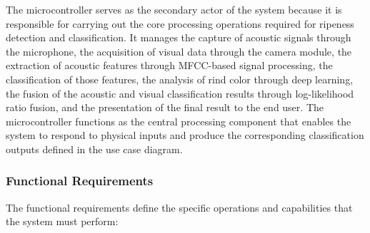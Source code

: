 \begin{thesisprose}
The microcontroller serves as the secondary actor of the system because it is responsible for carrying out the core processing operations required for ripeness detection and classification. It manages the capture of acoustic signals through the microphone, the acquisition of visual data through the camera module, the extraction of acoustic features through MFCC-based signal processing, the classification of those features, the analysis of rind color through deep learning, the fusion of the acoustic and visual classification results through log-likelihood ratio fusion, and the presentation of the final result to the end user. The microcontroller functions as the central processing component that enables the system to respond to physical inputs and produce the corresponding classification outputs defined in the use case diagram.

\subsubsection{Functional Requirements}

The functional requirements define the specific operations and capabilities that the system must perform:


\end{thesisprose}
